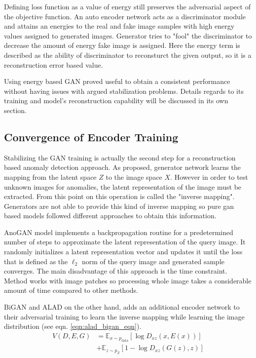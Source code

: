 Defining loss function as a value of energy still preserves the adversarial aspect of the objective
function. An auto encoder network acts as a discriminator module and attains an energies to the real
and fake image samples with high energy values assigned to generated images. Generator tries to
"fool" the discriminator to decrease the amount of energy fake image is assigned. Here the energy
term is described as the ability of discriminator to reconsturct the given output, so it is a
reconstruction error based value. 

Using energy based GAN proved useful to obtain a consistent performance without having issues with
argued stabilization problems. Details regards to its training and model's reconstruction capability
will be discussed in its own section.
\subsection{Convergence of Encoder Training}

Stabilizing the GAN training is actually the second step for a reconstruction based anomaly
detection approach. As proposed, generator network learns the mapping from the latent space $Z$ to
the image space $X$. However in order to test unknown images for anomalies, the latent
representation of the image must be extracted. From this point on this operation is called the
"inverse mapping". Generators are not able to provide this kind of inverse mapping so pure gan based
models followed different approaches to obtain this information.

AnoGAN model implements a backpropagation routine for a predetermined number of steps to approximate
the latent representation of the query image. It randomly initializes a latent representation vector
and updates it until the loss that is defined as the $\ell_{2}$ norm of the query image and
generated sample converges. The main disadvantage of this approach is the time constraint. Method
works with image patches so processing whole image takes a considerable amount of time compared to
other methods.

BiGAN and ALAD on the other hand, adds an additional encoder network to their adversarial training
to learn the inverse mapping while learning the image distribution (see eqn.
\ref{eqn:alad_bigan_eqn}).
\begin{equation}
\label{eqn:alad_bigan_eqn}
\begin{aligned} V\left(D, E, G\right) &=\mathbb{E}_{x \sim p_{\text{data}}}\left[\log D_{x z}(x, E(x))\right] \\ &+\mathbb{E}_{z \sim p_{Z}}\left[1-\log D_{x z}(G(z), z)\right]
\end{aligned}
\end{equation}

